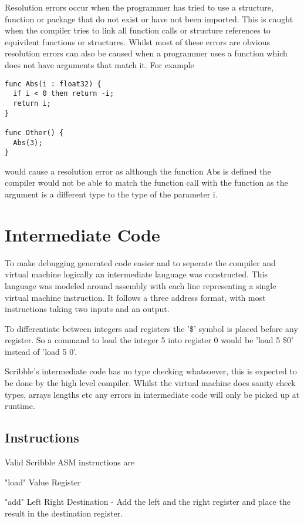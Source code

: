 \documentclass[]{final_report}
\begin{document}
Resolution errors occur when the programmer has tried to use a structure, function or package that do not exist or have not been imported. This is caught when the compiler tries to link all function calls or structure references to equivilent functions or structures. Whilst most of these errors are obvious resolution errors can also be caused when a programmer uses a function which does not have arguments that match it. For example
 
\begin{verbatim}
func Abs(i : float32) {
  if i < 0 then return -i;
  return i;
}

func Other() {
  Abs(3);
}
\end{verbatim}

would cause a resolution error as although the function Abs is defined the compiler would not be able to match the function call with the function as the argument is a different type to the type of the parameter i.

\chapter{Intermediate Code}

To make debugging generated code easier and to seperate the compiler and virtual machine logically an intermediate language was constructed. This language was modeled around assembly with each line representing a single virtual machine instruction. It follows a three address format, with most instructions taking two inputs and an output.

To differentiate between integers and registers the '\$' symbol is placed before any register. So a command to load the integer 5 into register 0 would be 'load 5 \$0' instead of 'load 5 0'.

Scribble's intermediate code has no type checking whatsoever, this is expected to be done by the high level compiler. Whilst the virtual machine does sanity check types, arrays lengths etc any errors in intermediate code will only be picked up at runtime.

\section{Instructions}

Valid Scribble ASM instructions are

"load" Value Register

"add" Left Right Destination - Add the left and the right register and place the result in the destination register.
\end{document}
